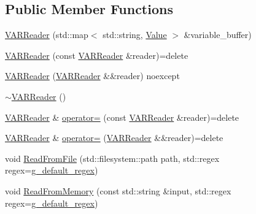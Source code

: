 \subsection*{Public Member Functions}
\begin{DoxyCompactItemize}
\item 
\mbox{\hyperlink{classmage_1_1loader_1_1_v_a_r_reader_a1bc1c64c05bac406be792d9d51739379}{V\+A\+R\+Reader}} (std\+::map$<$ std\+::string, \mbox{\hyperlink{namespacemage_a68ae02d3a746ed2f285aa2b10f131a21}{Value}} $>$ \&variable\+\_\+buffer)
\item 
\mbox{\hyperlink{classmage_1_1loader_1_1_v_a_r_reader_ab4ab4d94c90a2797ae40e54e0dd7c127}{V\+A\+R\+Reader}} (const \mbox{\hyperlink{classmage_1_1loader_1_1_v_a_r_reader}{V\+A\+R\+Reader}} \&reader)=delete
\item 
\mbox{\hyperlink{classmage_1_1loader_1_1_v_a_r_reader_aeefac440730fc89b16afa19695c956d5}{V\+A\+R\+Reader}} (\mbox{\hyperlink{classmage_1_1loader_1_1_v_a_r_reader}{V\+A\+R\+Reader}} \&\&reader) noexcept
\item 
\mbox{\hyperlink{classmage_1_1loader_1_1_v_a_r_reader_acd3bbd51ccc774d2f74a4520b6143990}{$\sim$\+V\+A\+R\+Reader}} ()
\item 
\mbox{\hyperlink{classmage_1_1loader_1_1_v_a_r_reader}{V\+A\+R\+Reader}} \& \mbox{\hyperlink{classmage_1_1loader_1_1_v_a_r_reader_a78d39071ad5103c848782ff82be397bb}{operator=}} (const \mbox{\hyperlink{classmage_1_1loader_1_1_v_a_r_reader}{V\+A\+R\+Reader}} \&reader)=delete
\item 
\mbox{\hyperlink{classmage_1_1loader_1_1_v_a_r_reader}{V\+A\+R\+Reader}} \& \mbox{\hyperlink{classmage_1_1loader_1_1_v_a_r_reader_a0da01229f594cb701b3e20d53be9d16e}{operator=}} (\mbox{\hyperlink{classmage_1_1loader_1_1_v_a_r_reader}{V\+A\+R\+Reader}} \&\&reader)=delete
\item 
void \mbox{\hyperlink{classmage_1_1loader_1_1_v_a_r_reader_ac819910b2ad9cf9751fa223d4f90ada0}{Read\+From\+File}} (std\+::filesystem\+::path path, std\+::regex regex=\mbox{\hyperlink{classmage_1_1_line_reader_a6b21fad06278a64bbdece198844a8cfa}{g\+\_\+default\+\_\+regex}})
\item 
void \mbox{\hyperlink{classmage_1_1loader_1_1_v_a_r_reader_adc2bf81611774d4a11da47812fcc0f6a}{Read\+From\+Memory}} (const std\+::string \&input, std\+::regex regex=\mbox{\hyperlink{classmage_1_1_line_reader_a6b21fad06278a64bbdece198844a8cfa}{g\+\_\+default\+\_\+regex}})
\end{DoxyCompactItemize}
